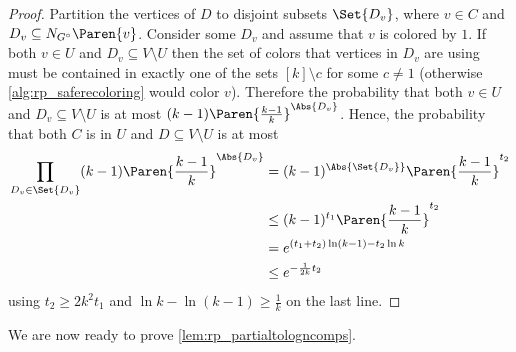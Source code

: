 \begin{proof}
    Partition the vertices of $D$ to disjoint subsets $\Set{D_{v}}$, where $v\in C$ and $D_{v}\subseteq N_{G^{\circ}}\Paren{v}$. Consider some $D_{v}$ and assume that $v$ is colored by $1$. If both $v\in U$ and $D_{v}\subseteq V\setminus U$ then the set of colors that vertices in $D_{v}$ are using must be contained in exactly one
    of the sets $[k]\setminus {c}$ for some $c\neq 1$ (otherwise \cref{alg:rp_saferecoloring} would color $v$).
    Therefore the probability that both $v\in U$ and $D_{v}\subseteq V\setminus U$
    is at most $(k-1)\Paren{\frac{k-1}{k}}^{\Abs{D_{v}}}$. Hence, the probability that both $C$ is in $U$ and $D\subseteq V\setminus U$ is at most
    \begin{align*}
        \prod_{D_{v}\in\Set{ D_{v}} }(k-1)\Paren{\frac{k-1}{k}}^{\Abs{D_{v}}} & =(k-1)^{\Abs{\Set{ D_{v}} }}\Paren{\frac{k-1}{k}}^{t_2}\\
        & \le(k-1)^{t_1}\Paren{\frac{k-1}{k}}^{t_2}\\
        & =e^{(t_1+t_2)\ln(k-1)-t_2\ln{k}}\\
        & \le e^{-\frac{1}{2k}t_2}
    \end{align*}
    using $t_2\ge 2k^2t_1$ and $\ln{k}-\ln(k-1)\geq \frac{1}{k}$ on the last line.
\end{proof}

We are now ready to prove \cref{lem:rp_partialtologncomps}.

